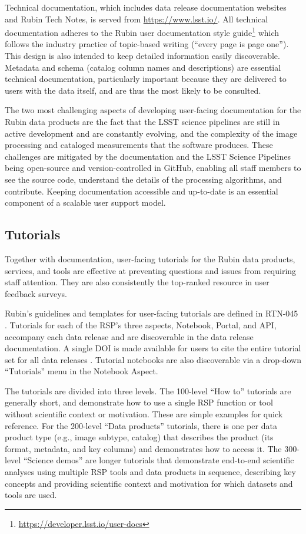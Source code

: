 Technical documentation, which includes data release documentation websites and Rubin Tech Notes, is served from  \url{https://www.lsst.io/}.
All technical documentation adheres to the Rubin user documentation style guide\footnote{\url{https://developer.lsst.io/user-docs}} which follows the industry practice of topic-based writing (``every page is page one'').
This design is also intended to keep detailed information easily discoverable.
Metadata and schema (catalog column names and descriptions) are essential technical documentation, particularly important because they are delivered to users with the data itself, and are thus the most likely to be consulted.

The two most challenging aspects of developing user-facing documentation for the Rubin data products are the fact that the LSST science pipelines \cite{PSTN-019} are still in active development and are constantly evolving, and the complexity of the image processing and cataloged measurements that the software produces.
These challenges are mitigated by the documentation and the LSST Science Pipelines being open-source and version-controlled in GitHub, enabling all staff members to see the source code, understand the details of the processing algorithms, and contribute.
Keeping documentation accessible and up-to-date is an essential component of a scalable user support model.


\subsection{Tutorials}

Together with documentation, user-facing tutorials for the Rubin data products, services, and tools are effective at preventing questions and issues from requiring staff attention.
They are also consistently the top-ranked resource in user feedback surveys.

Rubin's guidelines and templates for user-facing tutorials are defined in RTN-045 \cite{RTN-045}.
Tutorials for each of the RSP's three aspects, Notebook, Portal, and API, accompany each data release and are discoverable in the data release documentation.
A single DOI is made available for users to cite the entire tutorial set for all data releases \cite{10.11578/rubin/dc.20250909.20}.
Tutorial notebooks are also discoverable via a drop-down ``Tutorials'' menu in the Notebook Aspect.

The tutorials are divided into three levels.
The 100-level ``How to'' tutorials are generally short, and demonstrate how to use a single RSP function or tool without scientific context or motivation.
These are simple examples for quick reference.
For the 200-level ``Data products'' tutorials, there is one per data product type (e.g., image subtype, catalog) that describes the product (its format, metadata, and key columns) and demonstrates how to access it.
The 300-level ``Science demos'' are longer tutorials that demonstrate end-to-end scientific analyses using multiple RSP tools and data products in sequence, describing key concepts and providing scientific context and motivation for which datasets and tools are used.

